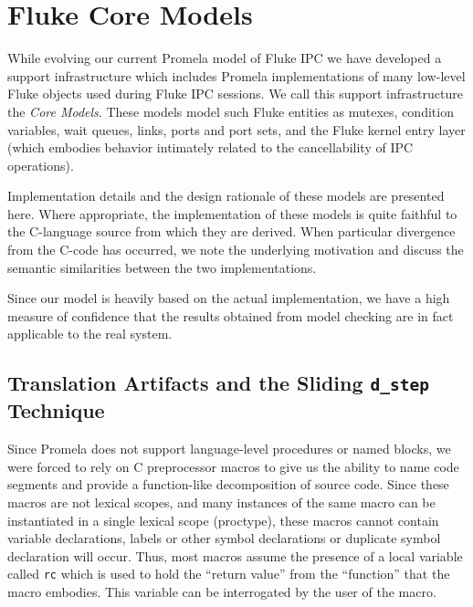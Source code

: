 \section{Fluke Core Models}
\label{core}

While evolving our current Promela model of Fluke
IPC we have developed a support infrastructure which includes Promela
implementations of many low-level Fluke objects used during Fluke IPC 
sessions. We call this support infrastructure the
{\it Core Models}.  These models model such Fluke entities as mutexes,
condition variables, wait queues, links, ports and port sets, and the
Fluke kernel entry layer (which embodies behavior intimately related to
the cancellability of IPC operations).

Implementation details and the design rationale of these models are
presented here.  Where appropriate, the implementation of these models is
quite faithful to the C-language source from which they are derived.  When
particular divergence from the C-code has occurred, we note the underlying
motivation and discuss the semantic similarities between the two
implementations.

Since our model is heavily based on the actual implementation, we have
a high measure of confidence that the results obtained from model
checking are in fact applicable to the real system.

\subsection{Translation Artifacts and the Sliding {\tt d_step} Technique}

Since Promela does not support language-level procedures or named blocks,
we were forced to rely on C preprocessor macros to give us the ability to
name code segments and provide a function-like decomposition of source
code.  Since these macros are not lexical scopes, and many instances of
the same macro can be instantiated in a single lexical scope (proctype),
these macros cannot contain variable declarations, labels or other symbol
declarations or duplicate symbol declaration will occur.  Thus, most macros
assume the presence of a local variable called {\tt rc} which
is used to hold the ``return value'' from the ``function'' that the macro
embodies.  This variable can be interrogated by the user of the macro.

